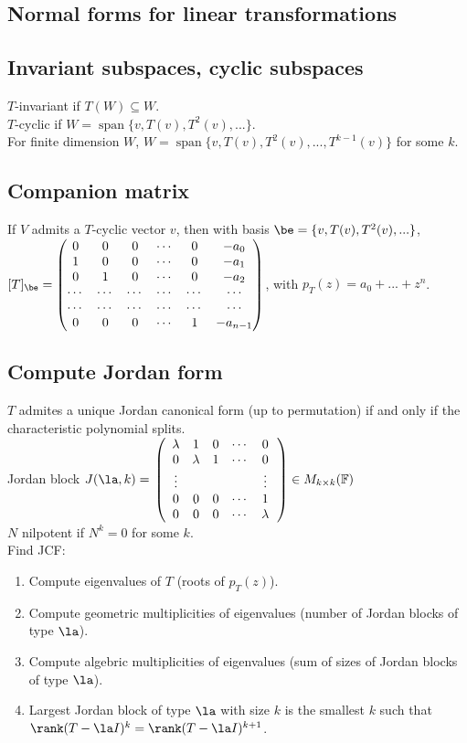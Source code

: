 \documentclass[10pt]{LatexTemplate/hw}
\begin{document}
\begin{multicols*}{2}
{}
\section{Normal forms for linear transformations}
\subsection{Invariant subspaces, cyclic subspaces}
$T$-invariant if $T(W)\subseteq W$.\\
$T$-cyclic if $W=\operatorname{span}\{v,T(v),T^2(v),...\}$.\\
For finite dimension $W$, $W=\operatorname{span}\{v,T(v),T^2(v),...,T^{k-1}(v)\}$ for some $k$.
\subsection{Companion matrix}
If $V$ admits a $T$-cyclic vector $v$, then with basis $\be=\{v,T(v),T^2(v),...\}$, $[T]_{\be}=
\begin{pmatrix}
0 & 0 & 0 & \cdots & 0 & -a_0 \\
1 & 0 & 0 & \cdots & 0 & -a_1 \\
0 & 1 & 0 & \cdots & 0 & -a_2 \\
\cdots & \cdots & \cdots & \cdots & \cdots & \cdots \\
\cdots & \cdots & \cdots & \cdots & \cdots & \cdots \\
0 & 0 & 0 & \cdots & 1 & -a_{n-1}
\end{pmatrix}$, with $p_T(z)=a_0+...+z^n$.
\subsection{Compute Jordan form}
$T$ admites a unique Jordan canonical form (up to permutation) if and only if the characteristic polynomial splits.\\
Jordan block $J(\la,k)=\left.\left(
\begin{array}
{ccccc}\lambda & 1 & 0 & \cdots & 0 \\
0 & \lambda & 1 & \cdots & 0 \\
\vdots & & & & \vdots \\
0 & 0 & 0 & \cdots & 1 \\
0 & 0 & 0 & \cdots & \lambda
\end{array}\right.\right)\in M_{k\times k}(\mathbb{F})$\\
$N$ nilpotent if $N^k=0$ for some $k$.\\
Find JCF:
\begin{enumerate}
    \item Compute eigenvalues of $T$ (roots of $p_T(z)$).
    \item Compute geometric multiplicities of eigenvalues (number of Jordan blocks of type $\la$).
    \item Compute algebric multiplicities of eigenvalues (sum of sizes of Jordan blocks of type $\la$).
    \item Largest Jordan block of type $\la$ with size $k$ is the smallest $k$ such that $\rank(T-\la I)^k=\rank(T-\la I)^{k+1}$.
\end{enumerate}


\end{multicols*}
\end{document}
